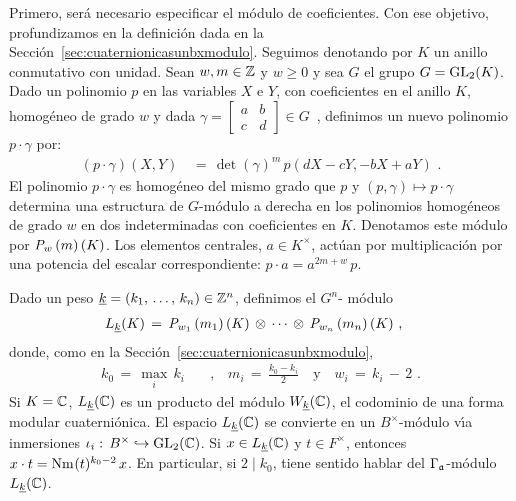 Primero, ser\'{a} necesario especificar el m\'{o}dulo de coeficientes. Con ese
objetivo, profundizamos en la definici\'{o}n dada en la
Secci\'{o}n~\ref{sec:cuaternionicasunbxmodulo}. Seguimos denotando por $K$ un
anillo conmutativo con unidad. Sean $w,m\in\bb{Z}$ y $w\geq 0$ y sea $G$ el
grupo $G=\GL_{2}(K)$. Dado un polinomio $p$ en las variables $X$ e $Y$, con
coeficientes en el anillo $K$, homog\'{e}neo de grado $w$ y dada
\begin{math}
	\gamma=\begin{bmatrix} a & b \\ c & d \end{bmatrix}\in G
\end{math}~, definimos un nuevo polinomio $p\cdot\gamma$ por:
\begin{align*}
	(p\cdot\gamma) (X,Y) & \,=\,\det(\gamma)^{m}\,p(dX-cY,-bX+aY)
	\text{ .}
\end{align*}
%
El polinomio $p\cdot\gamma$ es homog\'{e}neo del mismo grado que $p$ y
$(p,\gamma)\mapsto p\cdot\gamma$ determina una estructura de $G$-m\'{o}dulo a
derecha en los polinomios homog\'{e}neos de grado $w$ en dos indeterminadas con
coeficientes en $K$. Denotamos este m\'{o}dulo por $\wmpoli{w}{m}(K)$. Los
elementos centrales, $a\in K^{\times}$, act\'{u}an por multiplicaci\'{o}n por
una potencia del escalar correspondiente: $p\cdot a=a^{2m+w}\,p$.

Dado un peso $\peso{k}=(\lista{k}{n})\in\bb{Z}^{n}$, definimos el $G^{n}$-%
m\'{o}dulo
\begin{align*}
	L_{\peso{k}}(K) & \,=\,\wmpoli{w_{1}}{m_{1}}(K)\,\otimes\,\cdots\,
		\otimes\,\wmpoli{w_{n}}{m_{n}}(K)
	\text{ ,}
\end{align*}
%
donde, como en la Secci\'{o}n~\ref{sec:cuaternionicasunbxmodulo}, 
\begin{align*}
	k_{0} \,=\, \max_{i}\,k_{i} & \quad\text{,}\quad
	m_{i} \,=\, \frac{k_{0}-k_{i}}{2} \quad\text{y}\quad
	w_{i} \,=\, k_{i}\,-\,2
	\text{ .}
\end{align*}
%
Si $K=\bb{C}$, $L_{\peso{k}}(\bb{C})$ es un producto del m\'{o}dulo
$W_{\peso{k}}(\bb{C})$, el codominio de una forma modular cuaterni\'{o}nica.
El espacio $L_{\peso{k}}(\bb{C})$ se convierte en un $B^{\times}$-m\'{o}dulo
v\'{\i}a inmersiones $\iota_{i}:\,B^{\times}\hookrightarrow\GL_{2}(\bb{C})$.
Si $x\in L_{\peso{k}}(\bb{C})$ y $t\in F^{\times}$, entonces
$x\cdot t=\norma(t)^{k_{0}-2}\,x$. En particular, si $2\mid k_{0}$, tiene
sentido hablar del $\Gamma_{\frak{a}}$-m\'{o}dulo $L_{\peso{k}}(\bb{C})$.

